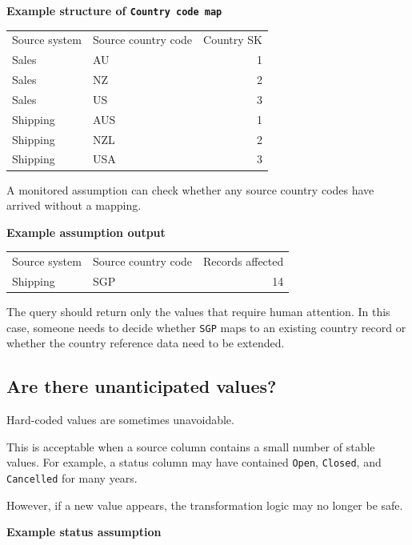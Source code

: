 \documentclass[10pt,openany,10pt]{book}
\newcounter{none}
\let\podeToprule\toprule
\let\podeMidrule\midrule
\let\podeBottomrule\bottomrule
\renewcommand{\toprule}{\arrayrulecolor{pbiGrid}\podeToprule}
\renewcommand{\midrule}{\arrayrulecolor{pbiGrid}\podeMidrule}
\renewcommand{\bottomrule}{\arrayrulecolor{pbiGrid}\podeBottomrule}
\begin{document}
\textbf{Example structure of
\texttt{\textquotesingle{}Country\ code\ map\textquotesingle{}}}

{\def\LTcaptype{none} %
\begin{longtable}[]{@{}llr@{}}
\toprule\noalign{}
Source system & Source country code & Country SK \\
\midrule\noalign{}
\endhead
\bottomrule\noalign{}
\endlastfoot
Sales & AU & 1 \\
Sales & NZ & 2 \\
Sales & US & 3 \\
Shipping & AUS & 1 \\
Shipping & NZL & 2 \\
Shipping & USA & 3 \\
\end{longtable}
}

A monitored assumption can check whether any source country codes have
arrived without a mapping.

\textbf{Example assumption output}

{\def\LTcaptype{none} %
\begin{longtable}[]{@{}llr@{}}
\toprule\noalign{}
Source system & Source country code & Records affected \\
\midrule\noalign{}
\endhead
\bottomrule\noalign{}
\endlastfoot
Shipping & SGP & 14 \\
\end{longtable}
}

The query should return only the values that require human attention. In
this case, someone needs to decide whether \texttt{SGP} maps to an
existing country record or whether the country reference data need to be
extended.

\subsection{Are there unanticipated
values?}\label{are-there-unanticipated-values}

Hard-coded values are sometimes unavoidable.

This is acceptable when a source column contains a small number of
stable values. For example, a status column may have contained
\texttt{Open}, \texttt{Closed}, and \texttt{Cancelled} for many years.

However, if a new value appears, the transformation logic may no longer
be safe.

\textbf{Example status assumption}
\end{document}

